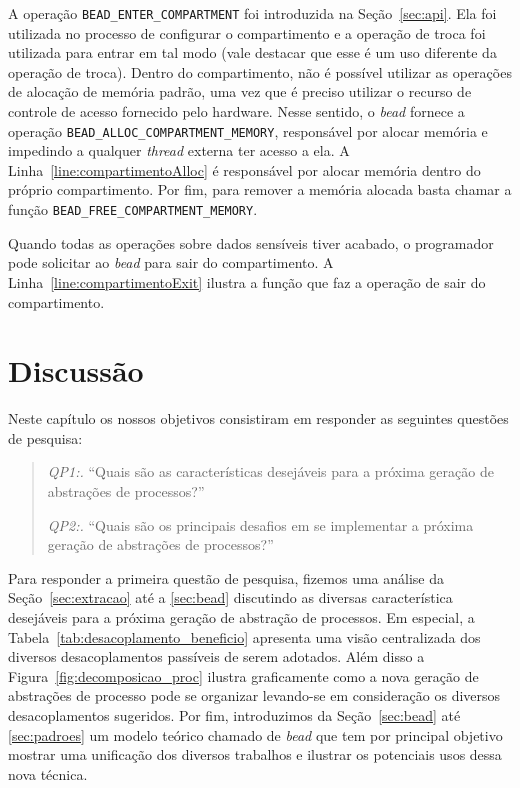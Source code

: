 A operação \texttt{BEAD\_ENTER\_COMPARTMENT} foi introduzida na Seção~\ref{sec:api}. Ela foi
utilizada no processo de configurar o compartimento e a operação de troca foi
utilizada para entrar em tal modo (vale destacar que esse é um uso diferente da
operação de troca). Dentro do compartimento, não é possível utilizar as operações de alocação de memória
padrão, uma vez que é preciso utilizar o recurso de controle de acesso fornecido
pelo hardware. Nesse sentido, o \emph{bead} fornece a operação
\texttt{BEAD\_ALLOC\_COMPARTMENT\_MEMORY}, responsável por alocar memória e impedindo
a qualquer \emph{thread} externa ter acesso a ela.
A Linha~\ref{line:compartimentoAlloc} é responsável por alocar memória
dentro do próprio compartimento. Por fim, para remover a memória alocada basta
chamar a função \texttt{BEAD\_FREE\_COMPARTMENT\_MEMORY}.

Quando todas as operações sobre dados sensíveis tiver acabado, o programador
pode solicitar ao \emph{bead} para sair do compartimento. A
Linha~\ref{line:compartimentoExit} ilustra a função que faz a operação de sair
do compartimento.

\section{Discussão}

Neste capítulo os nossos objetivos consistiram em responder as seguintes
questões de pesquisa:

\begin{quote}
 \item \textit{QP1:.} ``Quais são as características desejáveis para a próxima geração de abstrações de processos?''
 \item \textit{QP2:.} ``Quais são os principais desafios em se implementar a próxima geração de abstrações de processos?''
\end{quote}

Para responder a primeira questão de pesquisa, fizemos uma análise da
Seção~\ref{sec:extracao} até a \ref{sec:bead} discutindo as diversas
característica desejáveis para a próxima geração de abstração de processos. Em
especial, a Tabela~\ref{tab:desacoplamento_beneficio} apresenta uma visão
centralizada dos diversos desacoplamentos passíveis de serem adotados. Além
disso a Figura~\ref{fig:decomposicao_proc} ilustra graficamente como a nova
geração de abstrações de processo pode se organizar levando-se em consideração
os diversos desacoplamentos sugeridos. Por fim, introduzimos da
Seção~\ref{sec:bead} até \ref{sec:padroes} um modelo teórico chamado de
\emph{bead} que tem por principal objetivo mostrar uma unificação dos diversos
trabalhos e ilustrar os potenciais usos dessa nova técnica.

